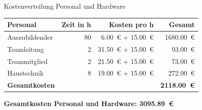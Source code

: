 \documentclass[10pt,ngerman]{beamer}
\begin{document}


\begin{frame}[fragile]{Kostenverteilung Personal und Hardware}
  \begin{table}[htbp]
    \centering
    \begin{tabular}{lrrr}
      \textbf{Personal}     & \textbf{Zeit in h} & \textbf{Kosten pro h}          & \textbf{Gesamt}          \\ \hline
      Auszubildender        & 80                 & \SI{6.00}{€} + \SI{15.00}{€}   & \SI{1680.00}{€}          \\
      Teamleitung           & 2                  & \SI{31.50}{€}  + \SI{15.00}{€} & \SI{93.00}{€}            \\
      Teammitglied          & 2                  & \SI{21.50}{€}  + \SI{15.00}{€} & \SI{73.00}{€}            \\
      Haustechnik           & 8                  & \SI{19.00}{€}  + \SI{15.00}{€} & \SI{272.00}{€}           \\ \hline
      \textbf{Gesamtkosten} &                    &                                & \textbf{\SI{2118.00}{€}}
    \end{tabular}
  \end{table}

  \vspace{0.4cm}

  \textbf{Gesamtkosten Personal und Hardware: \SI{3095.89}{€}}
\end{frame}

\end{document}
